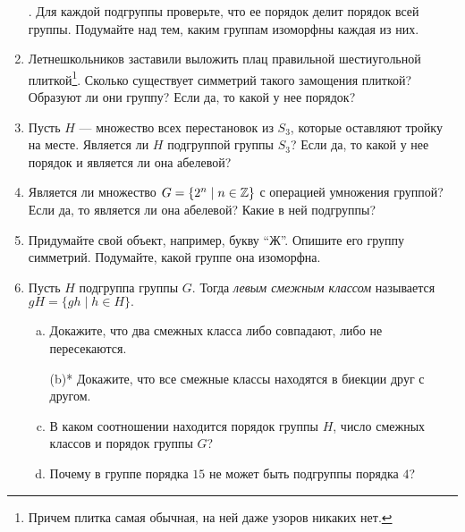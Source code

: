 \begin{enumerate}
.
    Для каждой подгруппы проверьте, что ее порядок делит порядок всей группы. Подумайте над тем, каким группам изоморфны каждая из них.
\item Летнешкольников заставили выложить плац правильной шестиугольной плиткой\footnote{Причем плитка самая обычная, на ней даже узоров никаких нет.}. Сколько существует симметрий такого замощения плиткой? Образуют ли они группу?
        Если да, то какой у нее порядок?
    \item Пусть $H$ --- множество всех перестановок из $S_3$, которые оставляют
        тройку на месте. Является ли $H$ подгруппой группы $S_3$?
        Если да, то какой у нее порядок и является ли она абелевой?
    \item Является ли множество $G = \{2^n \mid n \in \mathbb Z\}$ с операцией умножения группой?
        Если да, то является ли она абелевой? Какие в ней подгруппы?
    \item Придумайте свой объект, например, букву ``Ж''. Опишите его группу симметрий. Подумайте, какой группе она изоморфна.
    \item Пусть $H$ подгруппа группы $G$. Тогда \emph{левым смежным классом} называется \(gH =\{gh \mid h \in H\}.\)
        \begin{enumerate}[(a)]
        \item Докажите, что два смежных класса либо совпадают, либо не пересекаются.
        \item[(b)*] Докажите, что все смежные классы находятся в биекции друг с другом.
        \addtocounter{enumii}{1}
        \item В каком соотношении находится порядок группы $H$, число смежных классов и порядок группы $G$?
        \item Почему в группе порядка $15$ не может быть подгруппы порядка $4$?
        \end{enumerate}
\end{enumerate}
